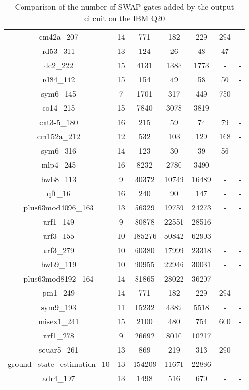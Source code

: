 \documentclass[runningheads]{llncs}
\begin{document}
\begin{table}[H]
\begin{center}
\begin{tabular}{|c|c|c|c|c|c|c|}
cm42a\_207 & 14 & 771 & 182 & 229 & 294 & - \\ 
rd53\_311 & 13 & 124 & 26 & 48 & 47 & - \\ 
dc2\_222 & 15 & 4131 & 1383 & 1773 & - & - \\ 
rd84\_142 & 15 & 154 & 49 & 58 & 50 & - \\ 
sym6\_145 & 7 & 1701 & 317 & 449 & 750 & - \\ 
co14\_215 & 15 & 7840 & 3078 & 3819 & - & - \\ 
cnt3-5\_180 & 16 & 215 & 59 & 74 & 79 & - \\ 
cm152a\_212 & 12 & 532 & 103 & 129 & 168 & - \\ 
sym6\_316 & 14 & 123 & 30 & 39 & 56 & - \\ 
mlp4\_245 & 16 & 8232 & 2780 & 3490 & - & - \\ 
hwb8\_113 & 9 & 30372 & 10749 & 16489 & - & - \\ 
qft\_16 & 16 & 240 & 90 & 147 & - & - \\ 
plus63mod4096\_163 & 13 & 56329 & 19759 & 24273 & - & - \\ 
urf1\_149 & 9 & 80878 & 22551 & 28516 & - & - \\ 
urf3\_155 & 10 & 185276 & 50842 & 62903 & - & - \\ 
urf3\_279 & 10 & 60380 & 17999 & 23318 & - & - \\ 
hwb9\_119 & 10 & 90955 & 22946 & 30031 & - & - \\ 
plus63mod8192\_164 & 14 & 81865 & 28022 & 36207 & - & - \\ 
pm1\_249 & 14 & 771 & 182 & 229 & 294 & - \\ 
sym9\_193 & 11 & 15232 & 4382 & 5518 & - & - \\ 
misex1\_241 & 15 & 2100 & 480 & 754 & 600 & - \\ 
urf1\_278 & 9 & 26692 & 8010 & 10217 & - & - \\ 
squar5\_261 & 13 & 869 & 219 & 313 & 290 & - \\ 
ground\_state\_estimation\_10 & 13 & 154209 & 11671 & 22886 & - & - \\ 
adr4\_197 & 13 & 1498 & 516 & 670 & - & - \\ 
			\hline
			\end{tabular} 
			\end{center}	
			\caption{Comparison of  the number of SWAP gates added by the 
			output circuit on the IBM Q20 }
			\label{tab4}  
			\end{table}
\end{document}
